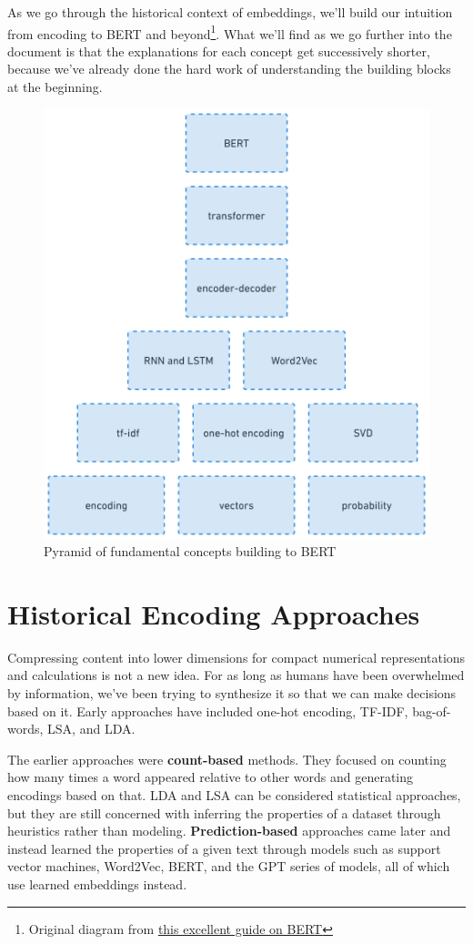 \documentclass[11pt, table]{diazessay} %
\begin{document}
\begin{sloppypar}
As we go through the historical context of embeddings, we'll build our intuition from encoding to BERT and beyond\footnote{Original diagram from  \href{http://mccormickml.com/2019/11/11/bert-research-ep-1-key-concepts-and-sources/}{this excellent guide on BERT}}. What we'll find as we go further into the document is that the explanations for each concept get successively shorter, because we've already done the hard work of understanding the building blocks at the beginning.

\begin{figure}[H]
\centering
\includegraphics[width=.6\textwidth]{figures/pyramid.png}
\caption{Pyramid of fundamental concepts building to BERT}
\end{figure}

\section{Historical Encoding Approaches}

Compressing content into lower dimensions for compact numerical representations and calculations is not a new idea. For as long as humans have been overwhelmed by information, we've been trying to synthesize it so that we can make decisions based on it. Early approaches have included one-hot encoding, TF-IDF, bag-of-words, LSA, and LDA.

The earlier approaches were \textbf{count-based} methods. They focused on counting how many times a word appeared relative to other words and generating encodings based on that. LDA and LSA can be considered statistical approaches, but they are still concerned with inferring the properties of a dataset through heuristics rather than modeling. \textbf{Prediction-based} approaches came later and instead learned the properties of a given text through models  such as support vector machines, Word2Vec, BERT, and the GPT series of models, all of which use learned embeddings instead.


\end{sloppypar}
\end{document}
